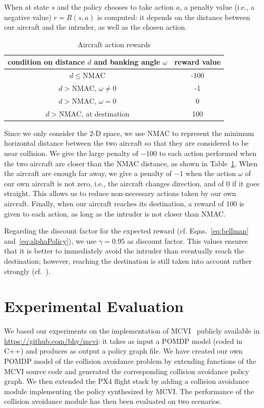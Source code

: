 \documentclass[orivec]{llncs}
\newcommand{\reward}{R}
\newcommand{\discount}{\gamma}
\begin{document}
When at state $s$ and the policy chooses to take action $a$, a penalty value (i.e., a negative value) $r = \reward(s, a)$ is computed:
it depends on the distance between our aircraft and the intruder, as well as the chosen action.

\begin{table}[t]
	\caption{Aircraft action rewards}
	\label{tab:NMACpenalties}
	\centering
	\begin{tabular}{c|c}
		condition on distance $d$ and banking angle $\omega$ & reward value \\
		\hline
		$d \leq \text{NMAC}$ & -100 \\
		$d > \text{NMAC}$, $\omega \neq 0$ & -1 \\
		$d > \text{NMAC}$, $\omega = 0$ & 0 \\
		$d > \text{NMAC}$, at destination & 100 
	\end{tabular}
\end{table}

Since we only consider the 2-D space, we use NMAC to represent the minimum horizontal distance between the two aircraft so that they are considered to be near collision. 
We give the large penalty of $-100$ to each action performed when the two aircraft are closer than the NMAC distance, as shown in Table~\ref{tab:NMACpenalties}.
When the aircraft are enough far away, we give a penalty of $-1$ when the action $\omega$ of our own aircraft is not zero, i.e., the aircraft changes direction, and of $0$ if it goes straight.
This allows us to reduce non-necessary actions taken by our own aircraft. 
Finally, when our aircraft reaches its destination, a reward of $100$ is given to each action, as long as the intruder is not closer than NMAC.

Regarding the discount factor for the expected reward (cf. Eqns.~\eqref{eq:bellman} and~\eqref{eq:alphaPolicy}), we use $\discount = 0.95$ as discount factor.
This values ensures that it is better to immediately avoid the intruder than eventually reach the destination; 
however, reaching the destination is still taken into account rather strongly (cf.~\cite{RLIntro}).


\section{Experimental Evaluation}
\label{sec:experiments}

We based our experiments on the implementation of MCVI~\cite{DBLP:conf/rss/Bai-RSS-11} publicly available in \url{https://github.com/bhy/mcvi}: 
it takes as input a POMDP model (coded in C++) and produces as output a policy graph file. 
We have created our own POMDP model of the collision avoidance problem by extending functions of the MCVI source code and generated the corresponding collision avoidance policy graph. 
We then extended the PX4 flight stack by adding a collision avoidance module implementing the policy synthesized by MCVI.
The performance of the collision avoidance module has then been evaluated on two scenarios.
\end{document}
